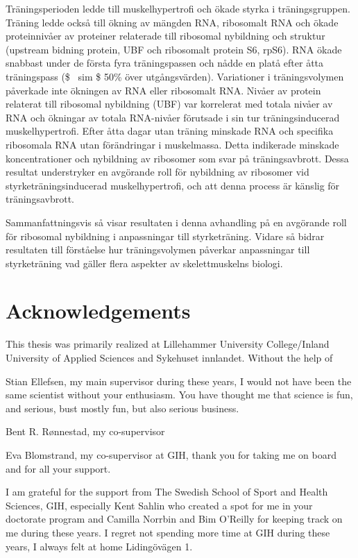 \documentclass[twoside,10pt]{gihclass} %
\begin{document}
Träningsperioden ledde till muskelhypertrofi och ökade styrka i träningsgruppen. Träning ledde också till ökning av mängden RNA, ribosomalt RNA och ökade proteinnivåer av proteiner relaterade till ribosomal nybildning och struktur (upstream bidning protein, UBF och ribosomalt protein S6, rpS6).
RNA ökade snabbast under de första fyra träningspassen och nådde en platå efter åtta träningspass (\$ ~sim \$ 50\% över utgångsvärden). Variationer i träningsvolymen påverkade inte ökningen av RNA eller ribosomalt RNA.
Nivåer av protein relaterat till ribosomal nybildning (UBF) var korrelerat med totala nivåer av RNA och ökningar av totala RNA-nivåer förutsade i sin tur träningsinducerad muskelhypertrofi. Efter åtta dagar utan träning minskade RNA och specifika ribosomala RNA utan förändringar i muskelmassa. Detta indikerade minskade koncentrationer och nybildning av ribosomer som svar på träningsavbrott. Dessa resultat understryker en avgörande roll för nybildning av ribosomer vid styrketräningsinducerad muskelhypertrofi, och att denna process är känslig för träningsavbrott.

Sammanfattningsvis så visar resultaten i denna avhandling på en avgörande roll för ribosomal nybildning i anpassningar till styrketräning. Vidare så bidrar resultaten till förståelse hur träningsvolymen påverkar anpassningar till styrketräning vad gäller flera aspekter av skelettmuskelns biologi.

\hypertarget{acknowledgements}{%
\chapter{Acknowledgements}\label{acknowledgements}}

This thesis was primarily realized at Lillehammer University College/Inland University of Applied Sciences and Sykehuset innlandet. Without the help of

Stian Ellefsen, my main supervisor during these years, I would not have been the same scientist without your enthusiasm. You have thought me that science is fun, and serious, bust mostly fun, but also serious business.

Bent R. Rønnestad, my co-supervisor

Eva Blomstrand, my co-supervisor at GIH, thank you for taking me on board and for all your support.

I am grateful for the support from The Swedish School of Sport and Health
Sciences, GIH, especially Kent Sahlin who created a spot for me in your doctorate program and Camilla Norrbin and Bim O'Reilly for keeping track on me during these years. I regret not spending more time at GIH during these years, I always felt at home Lidingövägen 1.
\end{document}

